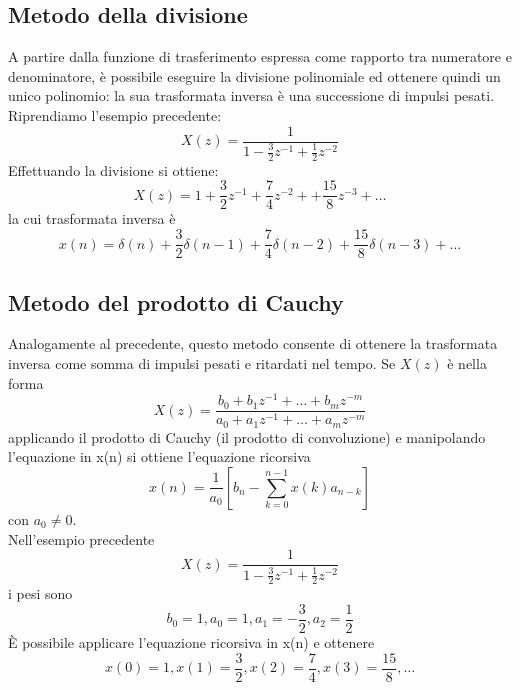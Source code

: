 \subsection{Metodo della divisione}
A partire dalla funzione di trasferimento espressa come rapporto tra numeratore e denominatore, \`e possibile eseguire la divisione polinomiale ed ottenere quindi un unico polinomio: la sua trasformata inversa \`e una successione di impulsi pesati.
Riprendiamo l'esempio precedente: 
\begin{displaymath}
X(z)=\frac{1}{1-\frac{3}{2}z^{-1}+\frac{1}{2}z^{-2}}
\end{displaymath}
Effettuando la divisione si ottiene:
\begin{displaymath}
X(z)=1+ \frac{3}{2} z^{-1}+ \frac{7}{4} z^{-2}+ + \frac{15}{8} z^{-3} +\ldots
\end{displaymath}
la cui trasformata inversa \`e
\begin{displaymath}
x(n)=\delta(n)+ \frac{3}{2}\delta(n-1)+ \frac{7}{4}\delta(n-2)+ \frac{15}{8}\delta(n-3) + \ldots
\end{displaymath}

\subsection{Metodo del prodotto di Cauchy}
Analogamente al precedente, questo metodo consente di ottenere la trasformata inversa come somma di impulsi pesati e ritardati nel tempo.
Se $X(z)$ \`e nella forma
\begin{displaymath}
X(z)=\frac{b_0 + b_1 z^{-1}+\ldots + b_m z^{-m}}{a_0 + a_1 z^{-1}+\ldots + a_m z^{-m}}
\end{displaymath}
applicando il prodotto di Cauchy (il prodotto di convoluzione) e manipolando l'equazione in x(n) si ottiene l'equazione ricorsiva
\begin{displaymath}
x(n)=\frac{1}{a_0}\left[ b_n - \sum_{k=0}^{n-1} x(k) a_{n-k}\right]
\end{displaymath}
con $a_0 \neq 0$. \\
Nell'esempio precedente
\begin{displaymath}
X(z)=\frac{1}{1-\frac{3}{2}z^{-1}+\frac{1}{2}z^{-2}}
\end{displaymath}
i pesi sono
\begin{displaymath}
b_0 = 1, a_0=1, a_1=-\frac{3}{2}, a_2=\frac{1}{2}
\end{displaymath}
\`E possibile applicare l'equazione ricorsiva in x(n) e ottenere
\begin{displaymath}
x(0)=1, x(1)=\frac{3}{2}, x(2)=\frac{7}{4}, x(3)=\frac{15}{8}, \ldots
\end{displaymath}

